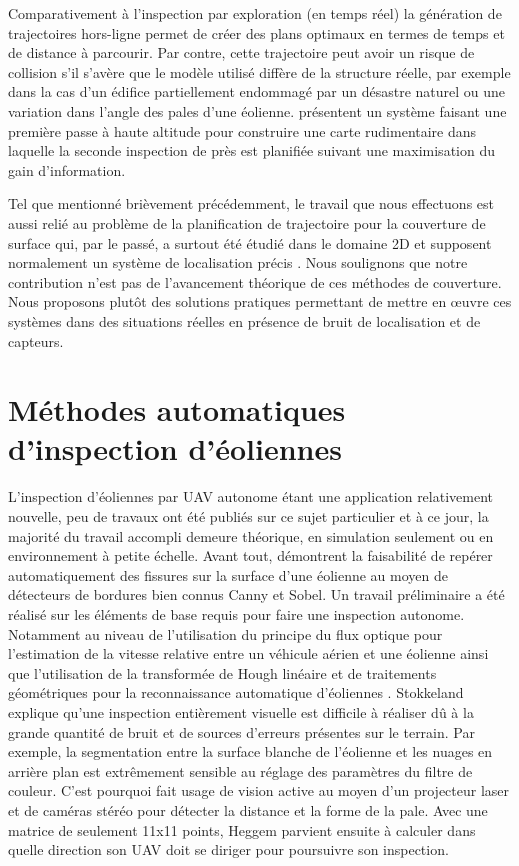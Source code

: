Comparativement à l'inspection par exploration (en temps réel) la génération de trajectoires hors-ligne permet de créer des plans optimaux en termes de temps et de distance à parcourir. Par contre, cette trajectoire peut avoir un risque de collision s'il s'avère que le modèle utilisé diffère de la structure réelle, par exemple dans la cas d'un édifice partiellement endommagé par un désastre naturel ou une variation dans l'angle des pales d'une éolienne. \citep{Hepp2017} présentent un système faisant une première passe à haute altitude pour construire une carte rudimentaire dans laquelle la seconde inspection de près est planifiée suivant une maximisation du gain d'information.

Tel que mentionné brièvement précédemment, le travail que nous effectuons est aussi relié au problème de la planification de trajectoire pour la couverture de surface qui, par le passé, a surtout été étudié dans le domaine 2D et supposent normalement un système de localisation précis \citep{Hert1996, acar2002morse, Acar2002, lim2014crack}. Nous soulignons que notre contribution n'est pas de l'avancement théorique de ces méthodes de couverture. Nous proposons plutôt des solutions pratiques permettant de mettre en \oe uvre ces systèmes dans des situations réelles en présence de bruit de localisation et de capteurs.

\section{Méthodes automatiques d'inspection d'éoliennes}\label{subsec:eolienne}

L'inspection d'éoliennes par UAV autonome étant une application relativement nouvelle, peu de travaux ont été publiés sur ce sujet particulier et à ce jour, la majorité du travail accompli demeure théorique, en simulation seulement ou en environnement à petite échelle. Avant tout, \citep{Zhang2014} démontrent la faisabilité de repérer automatiquement des fissures sur la surface d'une éolienne au moyen de détecteurs de bordures bien connus Canny et Sobel. Un travail préliminaire a été réalisé sur les éléments de base requis pour faire une inspection autonome. Notamment au niveau de l'utilisation du principe du flux optique pour l'estimation de la vitesse relative entre un véhicule aérien et une éolienne \citep{Hoglund2014} ainsi que l'utilisation de la transformée de Hough linéaire et de traitements géométriques pour la reconnaissance automatique d'éoliennes \citep{Stokkeland2015}. Stokkeland explique qu'une inspection entièrement visuelle est difficile à réaliser dû à la grande quantité de bruit et de sources d'erreurs présentes sur le terrain. Par exemple, la segmentation entre la surface blanche de l'éolienne et les nuages en arrière plan est extrêmement sensible au réglage des paramètres du filtre de couleur. C'est pourquoi \citep{Heggem2017} fait usage de vision active au moyen d'un projecteur laser et de caméras stéréo pour détecter la distance et la forme de la pale. Avec une matrice de seulement 11x11 points, Heggem parvient ensuite à calculer dans quelle direction son UAV doit se diriger pour poursuivre son inspection.


